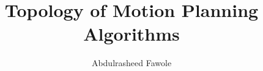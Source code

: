 \usepackage{amsmath, amsfonts, amssymb, amsthm}
\usepackage[
    lmargin=3.7cm,%
	rmargin=2.5cm,%
	bmargin=2.5cm,%
	tmargin=2.5cm %
]{geometry}
\usepackage{graphicx}
\usepackage{float}

\graphicspath{ {../images/} }

\theoremstyle{definition}
\newtheorem{thm}{Theorem}[section]
\newtheorem{defn}{Definition}[section]
\newtheorem*{notn}{Notation}

\newcommand{\ra}{\rightarrow}
\newcommand{\lra}{\longrightarrow}
\newcommand{\disp}{\displaystyle}
\newcommand{\htp}[1]{\underset{#1}{\simeq}} %


\title{Topology of Motion Planning Algorithms}
\author{Abdulrasheed Fawole}